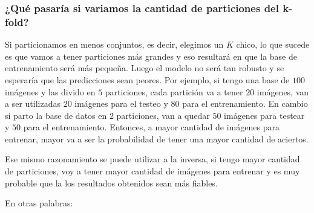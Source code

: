 \subsubsection{¿Qué pasaría si variamos la cantidad de particiones del k-fold?}

Si particionamos en menos conjuntos, es decir, elegimos un $K$ chico, lo que sucede es que vamos a tener particiones más grandes y eso resultará en que la base de entrenamiento será más pequeña. Luego el modelo no será tan robusto y se esperaría que las predicciones sean peores. Por ejemplo, si tengo una base de $100$ imágenes y las divido en $5$ particiones, cada partición va a tener $20$ imágenes, van a ser utilizadas $20$ imágenes para el testeo y $80$ para el entrenamiento. En cambio si parto la base de datos en $2$ particiones, van a quedar $50$ imágenes para testear y $50$ para el entrenamiento. Entonces, a mayor cantidad de imágenes para entrenar, mayor va a ser la probabilidad de tener una mayor cantidad de aciertos.

Ese mismo razonamiento se puede utilizar a la inversa, si tengo mayor cantidad de particiones, voy a tener mayor cantidad de imágenes para entrenar y es muy probable que la los resultados obtenidos sean más fiables.

En otras palabras:

